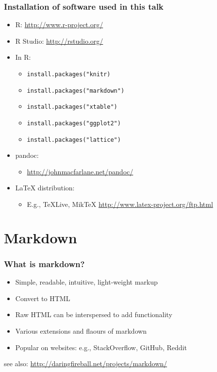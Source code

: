 \begin{frame}[fragile]\frametitle{Installation of software used in this
talk}

\begin{itemize}
\item
  R: \url{http://www.r-project.org/}
\item
  R Studio: \url{http://rstudio.org/}
\item
  In R:

  \begin{itemize}
  \item
    \texttt{install.packages("knitr)}
  \item
    \texttt{install.packages("markdown")}
  \item
    \texttt{install.packages("xtable")}
  \item
    \texttt{install.packages("ggplot2")}
  \item
    \texttt{install.packages("lattice")}
  \end{itemize}
\item
  pandoc:

  \begin{itemize}
  \item
    \url{http://johnmacfarlane.net/pandoc/}
  \end{itemize}
\item
  LaTeX distribution:

  \begin{itemize}
  \item
    E.g., TeXLive, MikTeX \url{http://www.latex-project.org/ftp.html}
  \end{itemize}
\end{itemize}

\end{frame}

\section{Markdown}

\begin{frame}\frametitle{What is markdown?}

\begin{itemize}
\item
  Simple, readable, intuitive, light-weight markup
\item
  Convert to HTML
\item
  Raw HTML can be interspersed to add functionality
\item
  Various extensions and flaours of markdown
\item
  Popular on websites: e.g., StackOverflow, GitHub, Reddit
\end{itemize}

\tiny{see also: \url{http://daringfireball.net/projects/markdown/ }}

\end{frame}

